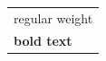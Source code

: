 \documentclass{standalone}
\begin{document}
\begin{tabular}{@{}l@{}}
regular weight \\
{\bfseries bold text} \\
\end{tabular}
\end{document}
